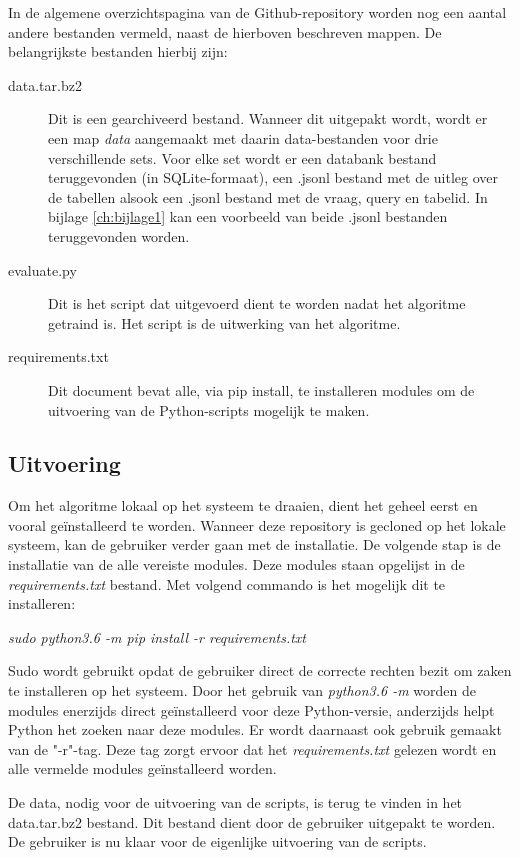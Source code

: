 In de algemene overzichtspagina van de Github-repository worden nog een aantal andere bestanden vermeld, naast de hierboven beschreven mappen. De belangrijkste bestanden hierbij zijn:
\begin{description}
	\item[data.tar.bz2] Dit is een gearchiveerd bestand. Wanneer dit uitgepakt wordt, wordt er een map \textit{data} aangemaakt met daarin data-bestanden voor drie verschillende sets. Voor elke set wordt er een databank bestand teruggevonden (in SQLite-formaat), een .jsonl bestand met de uitleg over de tabellen alsook een .jsonl bestand met de vraag, query en tabelid. In bijlage \ref{ch:bijlage1} kan een voorbeeld van beide .jsonl bestanden teruggevonden worden.
	\item[evaluate.py] Dit is het script dat uitgevoerd dient te worden nadat het algoritme getraind is. Het script is de uitwerking van het algoritme.
	\item[requirements.txt] Dit document bevat alle, via pip install, te installeren modules om de uitvoering van de Python-scripts mogelijk te maken.
\end{description}

\subsection{Uitvoering}

Om het algoritme lokaal op het systeem te draaien, dient het geheel eerst en vooral geïnstalleerd te worden. Wanneer deze repository is gecloned op het lokale systeem, kan de gebruiker verder gaan met de installatie. De volgende stap is de installatie van de alle vereiste modules. Deze modules staan opgelijst in de \textit{requirements.txt} bestand. Met volgend commando is het mogelijk dit te installeren:
\begin{center}
	\textit{sudo python3.6 -m pip install -r requirements.txt}
\end{center}
Sudo wordt gebruikt opdat de gebruiker direct de correcte rechten bezit om zaken te installeren op het systeem. Door het gebruik van \textit{python3.6 -m} worden de modules enerzijds direct geïnstalleerd voor deze Python-versie, anderzijds helpt Python het zoeken naar deze modules. Er wordt daarnaast ook gebruik gemaakt van de "-r"-tag. Deze tag zorgt ervoor dat het \textit{requirements.txt} gelezen wordt en alle vermelde modules geïnstalleerd worden.

De data, nodig voor de uitvoering van de scripts, is terug te vinden in het data.tar.bz2 bestand. Dit bestand dient door de gebruiker uitgepakt te worden. De gebruiker is nu klaar voor de eigenlijke uitvoering van de scripts.

